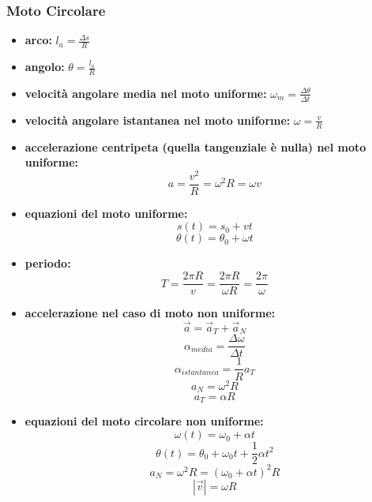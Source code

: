 \documentclass[a4paper,12pt, oneside]{book}
\begin{document}
\subsubsection{Moto Circolare}
\begin{itemize}
	\item \textbf{arco:} $l_a=\frac{\Delta s}{R}$
	\item \textbf{angolo:} $\theta=\frac{l_a}{R}$
	\item \textbf{velocità angolare media nel moto uniforme:} $\omega_m=\frac{\Delta\theta}{\Delta t}$
	\item \textbf{velocità angolare istantanea nel moto uniforme:} $\omega=\frac{v}{R}$
	\item \textbf{accelerazione centripeta (quella tangenziale è nulla) nel moto uniforme:}
	      $$a=\frac{v^2}{R}=\omega^2R=\omega v$$
	\item \textbf{equazioni del moto uniforme:}
	      $$s(t)=s_0+vt$$
	      $$\theta(t)=\theta_0+\omega t$$
	\item \textbf{periodo:}
	      $$T=\frac{2\pi R}{v}=\frac{2\pi R}{\omega R}=\frac{2\pi}{\omega}$$
	\item \textbf{accelerazione nel caso di moto non uniforme:}
	      $$\vec{a}=\vec{a}_T+\vec{a}_N$$
	      $$\alpha_{media}=\frac{\Delta\omega}{\Delta t}$$
	      $$\alpha_{istantanea}=\frac{1}{R}a_T$$
	      $$a_N=\omega^2 R$$
	      $$a_T=\alpha R$$
	\item \textbf{equazioni del moto circolare non uniforme:}
	      $$\omega(t)=\omega_0+\alpha t$$
	      $$\theta(t)=\theta_0+\omega_0t+\frac{1}{2}\alpha t^2$$
	      $$a_N=\omega^2 R=(\omega_0+\alpha t)^2 R$$
	      $$|\vec{v}|=\omega R$$
\end{itemize}
\end{document}
